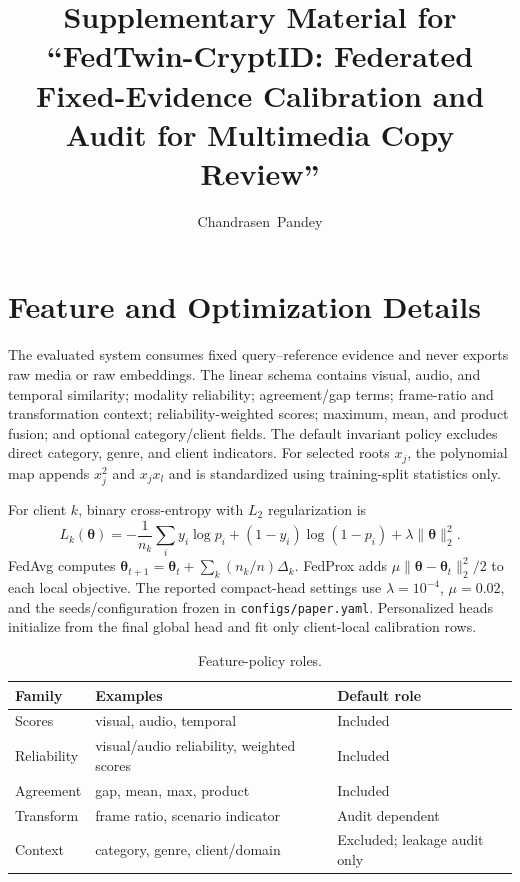 \documentclass[journal]{IEEEtran}
\newcommand{\ours}{FedTwin-CryptID}
\newcommand{\vectheta}{\boldsymbol{\theta}}
\begin{document}
\title{Supplementary Material for ``\ours: Federated Fixed-Evidence Calibration and Audit for Multimedia Copy Review''}
\author{Chandrasen~Pandey}
\maketitle

\section{Feature and Optimization Details}

The evaluated system consumes fixed query--reference evidence and never exports raw media or raw embeddings. The linear schema contains visual, audio, and temporal similarity; modality reliability; agreement/gap terms; frame-ratio and transformation context; reliability-weighted scores; maximum, mean, and product fusion; and optional category/client fields. The default invariant policy excludes direct category, genre, and client indicators. For selected roots $x_j$, the polynomial map appends $x_j^2$ and $x_jx_l$ and is standardized using training-split statistics only.

For client $k$, binary cross-entropy with $L_2$ regularization is
\begin{equation}
L_k(\vectheta)=-\frac{1}{n_k}\sum_i y_i\log p_i+(1-y_i)\log(1-p_i)+\lambda\lVert\vectheta\rVert_2^2.
\end{equation}
FedAvg computes $\vectheta_{t+1}=\vectheta_t+\sum_k(n_k/n)\Delta_k$. FedProx adds $\mu\lVert\vectheta-\vectheta_t\rVert_2^2/2$ to each local objective. The reported compact-head settings use $\lambda=10^{-4}$, $\mu=0.02$, and the seeds/configuration frozen in \texttt{configs/paper.yaml}. Personalized heads initialize from the final global head and fit only client-local calibration rows.

\begin{table}[!t]
\centering
\caption{Feature-policy roles.}
\scriptsize
\begin{tabularx}{\columnwidth}{p{}p{}X}
\toprule
Family & Examples & Default role \\
\midrule
Scores & visual, audio, temporal & Included \\
Reliability & visual/audio reliability, weighted scores & Included \\
Agreement & gap, mean, max, product & Included \\
Transform & frame ratio, scenario indicator & Audit dependent \\
Context & category, genre, client/domain & Excluded; leakage audit only \\
\bottomrule
\end{tabularx}
\end{table}
\end{document}
